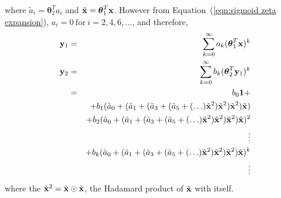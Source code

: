 \noindent where $\tilde a_i = \boldsymbol\theta_2^T a_i$ and $\tilde{\bold x} = \boldsymbol\theta_1^T {\bold x}$. However from Equation~(\ref{eqn:sigmoid zeta expansion}), $a_i  = 0\ \text{for}\ i = 2, 4, 6, \ldots$, and therefore,
\begin{eqnarray}
	{\bold y}_1 & = & \sum_{k=0}^\infty a_k (\boldsymbol\theta_1^T {\bold x})^k \nonumber \\
	{\bold y}_2 & = & \sum_{k=0}^\infty b_k (\boldsymbol\theta_2^T {\bold y}_1)^k \nonumber \\
		& = & b_0 {\bold 1} + \nonumber\\
		&   & + b_1 (\tilde a_0 +%
					(\tilde a_1 + %
						(\tilde a_3 + %
							(\tilde a_5 + %
								(\ldots) \tilde {\bold x}^2 )%
							\tilde {\bold x}^2 )%
						\tilde {\bold x}^2 )%
					\tilde {\bold x}) \nonumber \\
		&   & + b_2 (\tilde a_0 +%
					(\tilde a_1 + %
						(\tilde a_3 + %
							(\tilde a_5 + %
								(\ldots) \tilde {\bold x}^2 )%
							\tilde {\bold x}^2 )%
						\tilde {\bold x}^2 )%
					\tilde {\bold x})^2 \nonumber \\
		&   & \vdots \nonumber \\
		&   & + b_k (\tilde a_0 +%
					(\tilde a_1 + %
						(\tilde a_3 + %
							(\tilde a_5 + %
								(\ldots) \tilde {\bold x}^2 )%
							\tilde {\bold x}^2 )%
						\tilde {\bold x}^2 )%
					\tilde {\bold x})^k \nonumber \\
		&   & \vdots
\end{eqnarray}
\noindent where the $\tilde{\bold x}^2 = \tilde{\bold x} \odot \tilde{\bold x}$, the Hadamard product of $\tilde{\bold x}$ with itself.


